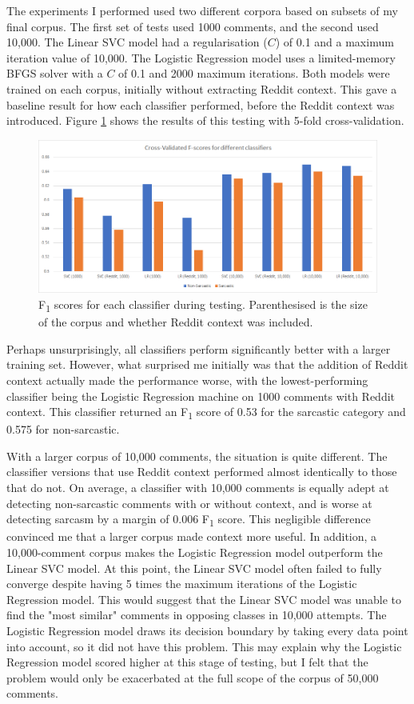 \documentclass[a4paper,12pt]{article}
\begin{document}
The experiments I performed used two different corpora based on subsets of my final corpus. The first set of tests used 1000 comments, and the second used 10,000. The Linear SVC model had a regularisation ($C$) of 0.1 and a maximum iteration value of 10,000. The Logistic Regression model uses a limited-memory BFGS solver with a $C$ of 0.1 and 2000 maximum iterations. Both models were trained on each corpus, initially without extracting Reddit context. This gave a baseline result for how each classifier performed, before the Reddit context was introduced. Figure \ref{fig:cmd5} shows the results of this testing with 5-fold cross-validation.

\begin{figure}[h!]
\includegraphics[width=\linewidth]{Figures/classification_report.png}
\caption{F\textsubscript{1} scores for each classifier during testing. Parenthesised is the size of the corpus and whether Reddit context was included.}
\label{fig:cmd5}
\end{figure}

Perhaps unsurprisingly, all classifiers perform significantly better with a larger training set. However, what surprised me initially was that the addition of Reddit context actually made the performance worse, with the lowest-performing classifier being the Logistic Regression machine on 1000 comments with Reddit context. This classifier returned an F\textsubscript{1} score of 0.53 for the sarcastic category and 0.575 for non-sarcastic.

With a larger corpus of 10,000 comments, the situation is quite different. The classifier versions that use Reddit context performed almost identically to those that do not. On average, a classifier with 10,000 comments is equally adept at detecting non-sarcastic comments with or without context, and is worse at detecting sarcasm by a margin of 0.006 F\textsubscript{1} score. This negligible difference convinced me that a larger corpus made context more useful. In addition, a 10,000-comment corpus makes the Logistic Regression model outperform the Linear SVC model. At this point, the Linear SVC model often failed to fully converge despite having 5 times the maximum iterations of the Logistic Regression model. This would suggest that the Linear SVC model was unable to find the "most similar" comments in opposing classes in 10,000 attempts. The Logistic Regression model draws its decision boundary by taking every data point into account, so it did not have this problem. This may explain why the Logistic Regression model scored higher at this stage of testing, but I felt that the problem would only be exacerbated at the full scope of the corpus of 50,000 comments.
\end{document}

